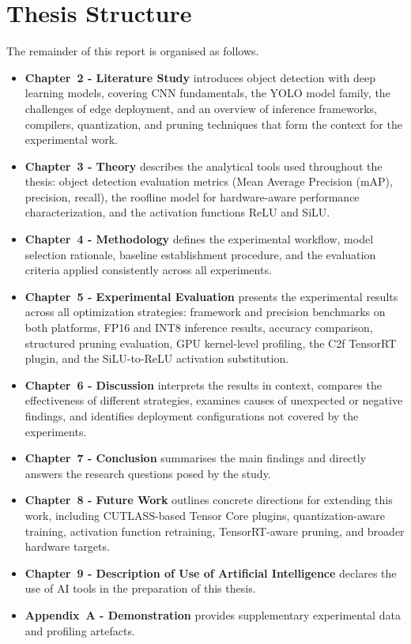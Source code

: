 \documentclass[12pt,a4paper]{report}
\begin{document}
\section{Thesis Structure}

The remainder of this report is organised as follows.

\begin{itemize}

\item \textbf{Chapter~2 - Literature Study} introduces object detection with deep learning models, covering CNN
fundamentals, the YOLO model family, the challenges of edge deployment, and an overview of inference frameworks,
compilers, quantization, and pruning techniques that form the context for the experimental work.

\item \textbf{Chapter~3 - Theory} describes the analytical tools used throughout the thesis: object detection evaluation
metrics (Mean Average Precision (mAP), precision, recall), the roofline model for hardware-aware performance characterization, and the activation
functions ReLU and SiLU.

\item \textbf{Chapter~4 - Methodology} defines the experimental workflow, model selection rationale, baseline
establishment procedure, and the evaluation criteria applied consistently across all experiments.

\item \textbf{Chapter~5 - Experimental Evaluation} presents the experimental results across all optimization strategies:
framework and precision benchmarks on both platforms, FP16 and INT8 inference results, accuracy comparison, structured
pruning evaluation, GPU kernel-level profiling, the C2f TensorRT plugin, and the SiLU-to-ReLU activation substitution.

\item \textbf{Chapter~6 - Discussion} interprets the results in context, compares the effectiveness of different
strategies, examines causes of unexpected or negative findings, and identifies deployment configurations not covered
by the experiments.

\item \textbf{Chapter~7 - Conclusion} summarises the main findings and directly answers the research questions posed
by the study.

\item \textbf{Chapter~8 - Future Work} outlines concrete directions for extending this work, including CUTLASS-based
Tensor Core plugins, quantization-aware training, activation function retraining, TensorRT-aware pruning, and broader
hardware targets.

\item \textbf{Chapter~9 - Description of Use of Artificial Intelligence} declares the use of AI tools in the preparation of this thesis.

\item \textbf{Appendix~A - Demonstration} provides supplementary experimental data and profiling artefacts.

\end{itemize}
\end{document}
